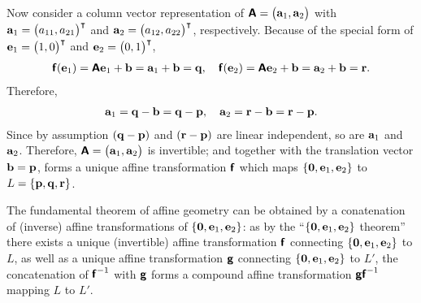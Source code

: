 {Now consider a column vector representation of $\textsf{\textbf{A}} = \begin{pmatrix} {\bf a}_1,{\bf a}_2\end{pmatrix}$
with
${\bf a}_1 = \begin{pmatrix}  a_{11},a_{21}\end{pmatrix}^\intercal$ and
${\bf a}_2 = \begin{pmatrix}  a_{12},a_{22}\end{pmatrix}^\intercal$,
respectively.
Because of the special form of
${\bf e}_1= \begin{pmatrix} 1,0\end{pmatrix}^\intercal$
and
${\bf e}_2= \begin{pmatrix} 0,1\end{pmatrix}^\intercal$,
\begin{equation}
\begin{split}
 \textsf{\textbf{f}}({\bf e}_1)= \textsf{\textbf{A}}{\bf e}_1 + {\bf b}
=  {\bf a}_1 + {\bf b}= {\bf q},\quad
 \textsf{\textbf{f}}({\bf e}_2)= \textsf{\textbf{A}}{\bf e}_2 + {\bf b}
=  {\bf a}_2 + {\bf b}= {\bf r}.
\end{split}
\label{2018-mm-ch-projgeom-0-pqr2}
\end{equation}
Therefore,
\begin{equation}
\begin{split}
{\bf a}_1=  {\bf q} - {\bf b} =  {\bf q} - {\bf p} , \quad
{\bf a}_2=  {\bf r} - {\bf b} =  {\bf r} - {\bf p} .
\end{split}
\label{2018-mm-ch-projgeom-0-pqr3}
\end{equation}
Since by assumption $({\bf q}-{\bf p})$ and $({\bf r}-{\bf p})$ are linear independent,
so are ${\bf a}_1$ and ${\bf a}_2$.
Therefore, $\textsf{\textbf{A}} = \begin{pmatrix} {\bf a}_1,{\bf a}_2\end{pmatrix}$ is invertible;
and together with the translation vector ${\bf b} = {\bf p}$, forms a unique
affine transformation $\textsf{\textbf{f}}$
which maps $\{{\bf 0},{\bf e}_1,{\bf e}_2\}$ to $L=\{{\bf p},{\bf q},{\bf r}\}$.

The fundamental theorem of affine geometry can be obtained by  a conatenation of (inverse) affine transformations of
$\{{\bf 0},{\bf e}_1,{\bf e}_2\}$:
as by the ``$\{{\bf 0},{\bf e}_1,{\bf e}_2\}$ theorem''
there exists
a unique (invertible) affine transformation $\textsf{\textbf{f}}$ connecting $\{{\bf 0},{\bf e}_1,{\bf e}_2\}$ to $L$,
as well as
a unique affine transformation $\textsf{\textbf{g}}$ connecting $\{{\bf 0},{\bf e}_1,{\bf e}_2\}$ to $L'$,
the concatenation of  $\textsf{\textbf{f}}^{-1}$ with $\textsf{\textbf{g}}$
forms a compound affine transformation $\textsf{\textbf{g}}\textsf{\textbf{f}}^{-1}$
mapping $L$ to $L'$.

\eproof
}

